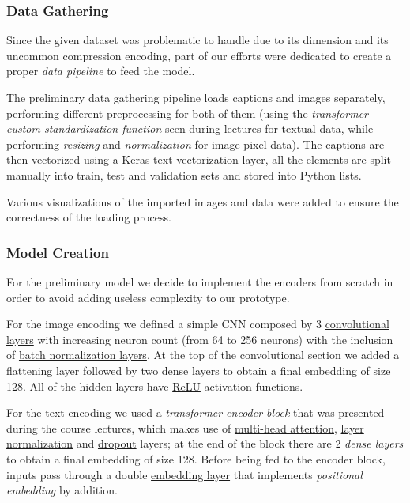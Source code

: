 \documentclass[12pt, a4paper]{article}
\begin{document}
\subsubsection{Data Gathering}
Since the given dataset was problematic to handle due to its dimension and its uncommon compression encoding, part of our efforts were dedicated to create a proper \textit{data pipeline} to feed the model.

The preliminary data gathering pipeline loads captions and images separately, performing different preprocessing for both of them (using the \textit{transformer custom standardization function} seen during lectures for textual data, while performing \textit{resizing} and \textit{normalization} for image pixel data).
The captions are then vectorized using a \href{https://www.tensorflow.org/api_docs/python/tf/keras/layers/TextVectorization}{Keras text vectorization layer}, all the elements are split manually into train, test and validation sets and stored into Python lists.

Various visualizations of the imported images and data were added to ensure the correctness of the loading process.

\subsubsection{Model Creation}
For the preliminary model we decide to implement the encoders from scratch in order to avoid adding useless complexity to our prototype.

For the image encoding we defined a simple CNN composed by 3 \href{https://www.tensorflow.org/api_docs/python/tf/keras/layers/Conv2D}{convolutional layers} with increasing neuron count (from 64 to 256 neurons) with the inclusion of \href{https://www.tensorflow.org/api_docs/python/tf/keras/layers/BatchNormalization}{batch normalization layers}.
At the top of the convolutional section we added a \href{https://www.tensorflow.org/api_docs/python/tf/keras/layers/Flatten}{flattening layer} followed by two \href{https://www.tensorflow.org/api_docs/python/tf/keras/layers/Dense}{dense layers} to obtain a final embedding of size 128.
All of the hidden layers have \href{https://www.tensorflow.org/api_docs/python/tf/keras/layers/ReLU}{ReLU} activation functions.

For the text encoding we used a \textit{transformer encoder block} that was presented during the course lectures, which makes use of \href{https://www.tensorflow.org/api_docs/python/tf/keras/layers/MultiHeadAttention}{multi-head attention}, \href{https://www.tensorflow.org/api_docs/python/tf/keras/layers/LayerNormalization}{layer normalization} and \href{https://www.tensorflow.org/api_docs/python/tf/keras/layers/Dropout}{dropout} layers; at the end of the block there are 2 \textit{dense layers} to obtain a final embedding of size 128.
Before being fed to the encoder block, inputs pass through a double \href{https://www.tensorflow.org/api_docs/python/tf/keras/layers/Embedding}{embedding layer} that implements \textit{positional embedding} by addition.
\end{document}
